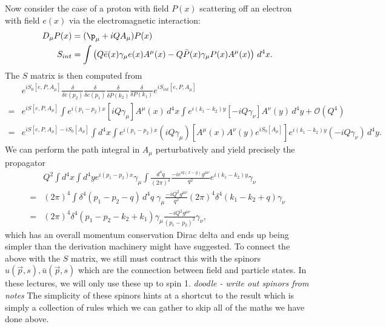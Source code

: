 \documentclass[relqm.tex]{subfiles}
\begin{document}
Now consider the case of a proton with field $P(x)$ scattering off an electron with field $e(x)$ via the electromagnetic interaction:
\begin{align}
    D_\mu P(x) &= (\p_\mu+iQA_\mu)P(x) \\
    S_{int} &= \int \left(Q\bar{e}(x)\gamma_\mu e(x)A^\mu(x) - Q\bar{P}(x)\gamma_\mu P(x)A^\mu(x)\right)\,d^4x.
\end{align}
The $S$ matrix is then computed from
\begin{equation}
    \begin{split}
        &e^{iS_0[e,P,A_\mu]}\frac{\delta}{\delta\bar{e}(p_2)}\frac{\delta}{\delta e(p_1)}\frac{\delta}{\delta\bar{P}(k_2)}\frac{\delta}{\delta P(k_1)}e^{iS_{int}[e,P,A_\mu]} \\
        =&e^{iS[e,P,A_\mu]}\int e^{i(p_1-p_2)x}[iQ\gamma_\mu]A^\mu(x)\,d^4x \int e^{i(k_1-k_2)y}[-iQ\gamma_\nu]A^\nu(y)\,d^4y + \mathcal{O}(Q^4) \\
        =&e^{iS[e,P,A_\mu]-iS_0[A_\mu]}\int d^4x \int e^{i(p_1-p_2)x}(iQ\gamma_\mu)\left[A^\mu(x)A^\nu(y)e^{iS_0[A_\mu]}\right]e^{i(k_1-k_2)y}(-iQ\gamma_\nu)\,d^4y.
    \end{split}
\end{equation}
We can perform the path integral in $A_\mu$ perturbatively and yield precisely the propagator
\begin{equation}
    \begin{split}
        &Q^2\int d^4x \int d^4y e^{i(p_1-p_2)x}\gamma_\mu \int \frac{d^4q}{(2\pi)^4}\frac{-ie^{iq(x-y)}g^{\mu\nu}}{q^2}e^{i(k_1-k_2)y}\gamma_\nu \\
        =&(2\pi)^4 \int \delta^4(p_1-p_2-q)\,d^4q\; \gamma_\mu\frac{-iQ^2g^{\mu\nu}}{q^2}(2\pi)^4\delta^4(k_1-k_2+q)\gamma_\nu \\
        =&(2\pi)^4\delta^4(p_1-p_2-k_2+k_1)\gamma_\mu\frac{-iQ^2g^{\mu\nu}}{(p_1-p_2)^2}\gamma_\nu,
    \end{split}
\end{equation}
which has an overall momentum conservation Dirac delta and ends up being simpler than the derivation machinery might have suggested. 
To connect the above with the $S$ matrix, we still must contract this with the spinors $u(\vec{p},s),\bar{u}(\vec{p},s)$ which are the connection between field and particle states.
In these lectures, we will only use these up to spin 1.
\emph{doodle - write out spinors from notes}
The simplicity of these spinors hints at a shortcut to the result which is simply a collection of rules which we can gather to skip all of the maths we have done above. 
\end{document}
